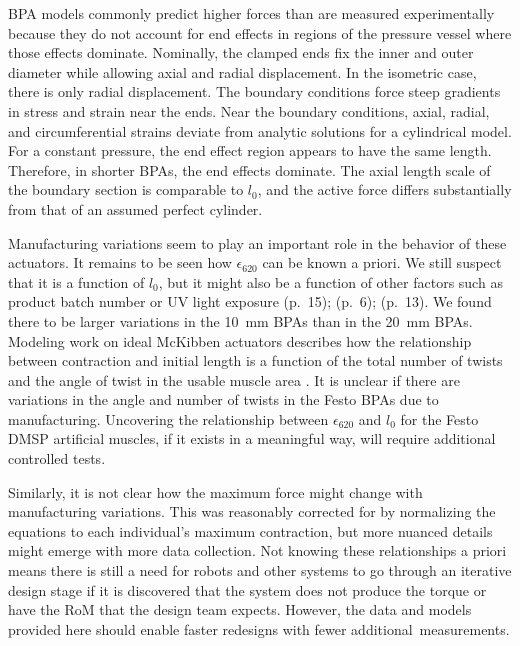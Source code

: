 BPA models commonly predict higher forces than are measured experimentally because they do not account for end effects in regions of the pressure vessel where those effects dominate.	Nominally, the clamped ends fix the inner and outer diameter while allowing axial and radial displacement. In the isometric case, there is only radial displacement. The boundary conditions force steep gradients in stress and strain near the ends. Near the boundary conditions, axial, radial, and circumferential strains deviate from analytic solutions for a cylindrical model. For a constant pressure, the end effect region appears to have the same length. Therefore, in shorter BPAs, the end effects dominate. The axial length scale of the boundary section is comparable to $l_0$,  and the active force differs substantially from that of an assumed perfect cylinder.

Manufacturing variations seem to play an important role in the behavior of these actuators. It remains to be seen how $\epsilon_{620}$ can be known a priori. We still suspect that it is a function of $l_0$, but it might also be a function of other factors such as product batch number or UV light exposure \citep{festo_2026} (p.~15); \citep{festo_2018} (p.~6); \citep{festo_2013} (p.~13). We found there to be larger variations in the \qtylist{10}{\mm} BPAs than in the \qtylist{20}{\mm} BPAs. Modeling work on ideal McKibben actuators describes how the relationship between contraction and initial length is a function of the total number of twists and the angle of twist in the usable muscle area \citep{chou_measurement_1996}. It is unclear if there are variations in the angle and number of twists in the Festo BPAs due to manufacturing. Uncovering the relationship between $\epsilon_{620}$ and $l_0$ for the Festo DMSP artificial muscles, if it exists in a meaningful way, will require additional controlled tests. 

Similarly, it is not clear how the maximum force might change with manufacturing variations. This was reasonably corrected for by normalizing the equations to each individual's maximum contraction, but more nuanced details might emerge with more data collection. Not knowing these relationships a priori means there is still a need for robots and other systems to go through an iterative design stage if it is discovered that the system does not produce the torque or have the RoM that the design team expects. However, the data and models provided here should enable faster redesigns with fewer \mbox{additional measurements.}

